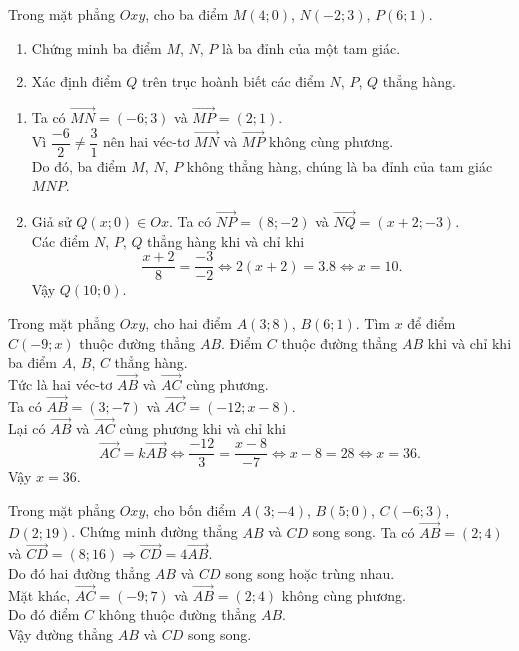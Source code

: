\begin{bt}%
Trong mặt phẳng $Oxy$, cho ba điểm $M(4;0)$, $N(-2;3)$, $P(6;1)$.
\begin{enumerate}
\item Chứng minh ba điểm $M$, $N$, $P$ là ba đỉnh của một tam giác.
\item Xác định điểm $Q$ trên trục hoành biết các điểm $N$, $P$, $Q$ thẳng hàng.
\end{enumerate}
\loigiai
{\begin{enumerate}
\item Ta có $\overrightarrow{MN}=(-6;3)$ và $\overrightarrow{MP}=(2;1)$.\\
Vì $\dfrac{-6}{2} \neq \dfrac{3}{1}$ nên hai véc-tơ $\overrightarrow{MN}$ và $\overrightarrow{MP}$ không cùng phương.\\ 
Do đó, ba điểm $M$, $N$, $P$ không thẳng hàng, chúng là ba đỉnh của tam giác $MNP$.
\item Giả sử $Q(x;0) \in Ox$. Ta có $\overrightarrow{NP}=(8;-2)$ và $\overrightarrow{NQ}=(x+2;-3)$.\\
Các điểm $N$, $P$, $Q$ thẳng hàng khi và chỉ khi 
$$\dfrac{x+2}{8}=\dfrac{-3}{-2} \Leftrightarrow 2(x+2)=3.8 \Leftrightarrow x=10.$$
Vậy $Q(10;0)$.
\end{enumerate}}
\end{bt}

\begin{bt}%
Trong mặt phẳng $Oxy$, cho hai điểm $A(3;8)$, $B(6;1)$. Tìm $x$ để điểm $C(-9;x)$ thuộc đường thẳng $AB$.
\loigiai
{Điểm $C$ thuộc đường thẳng $AB$ khi và chỉ khi ba điểm $A$, $B$, $C$ thẳng hàng.\\ 
Tức là hai véc-tơ $\overrightarrow{AB}$ và $\overrightarrow{AC}$ cùng phương.\\
Ta có $\overrightarrow{AB}=(3;-7)$ và $\overrightarrow{AC}=(-12;x-8)$.\\
Lại có $\overrightarrow{AB}$ và $\overrightarrow{AC}$ cùng phương khi và chỉ khi 
$$\overrightarrow{AC}=k\overrightarrow{AB} \Leftrightarrow \dfrac{-12}{3}=\dfrac{x-8}{-7} \Leftrightarrow x-8=28 \Leftrightarrow x=36.$$
Vậy $x=36$.}
\end{bt}

\begin{bt}%
Trong mặt phẳng $Oxy$, cho bốn điểm $A(3;-4)$, $B(5;0)$, $C(-6;3)$, $D(2;19)$. Chứng minh đường thẳng $AB$ và $CD$ song song.
\loigiai
{Ta có $\overrightarrow{AB}=(2;4)$ và $\overrightarrow{CD}=(8;16) \Rightarrow \overrightarrow{CD}=4\overrightarrow{AB}$.\\ 
Do đó hai đường thẳng $AB$ và $CD$ song song hoặc trùng nhau.\\
Mặt khác, $\overrightarrow{AC}=(-9;7)$ và $\overrightarrow{AB}=(2;4)$ không cùng phương.\\ 
Do đó điểm $C$ không thuộc đường thẳng $AB$.\\
Vậy đường thẳng $AB$ và $CD$ song song.}
\end{bt}

